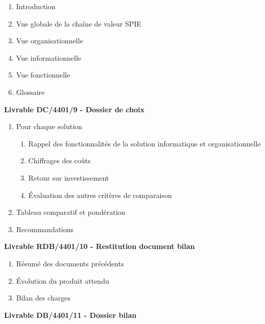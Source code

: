\begin{enumerate}
    \item Introduction
    \item Vue globale de la chaîne de valeur SPIE
    \item Vue organisationnelle 
    \item Vue informationnelle 
    \item Vue fonctionnelle
    \item Glossaire  \\
\end{enumerate}

\bf{Livrable DC/4401/9 - Dossier de choix} \\

\begin{enumerate}
    \item Pour chaque solution
        \begin{enumerate}
            \item Rappel des fonctionnalités de la solution informatique et organisationnelle
            \item Chiffrages des coûts
            \item Retour sur investissement
            \item Évaluation des autres critères de comparaison
        \end{enumerate}
    \item Tableau comparatif et pondération
    \item Recommandations \\
\end{enumerate}
 
\bf{Livrable RDB/4401/10 - Restitution document bilan} \\

\begin{enumerate}
    \item Résumé des documents précédents
    \item Évolution du produit attendu
    \item Bilan des charges \\
\end{enumerate}

\bf{Livrable DB/4401/11 - Dossier bilan} \\

